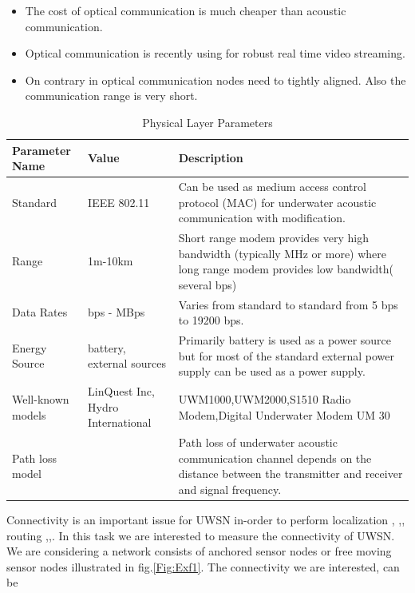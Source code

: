 \documentclass[12pt]{article}
\begin{document}
\begin{itemize}
\begin{itemize}
\cite{doniec2009aquaoptical}.
\item The cost of optical communication is much cheaper than acoustic communication.
\item Optical communication is recently using for robust real time video streaming\cite{doniec2013robust}.
\item On contrary in optical communication nodes need to tightly aligned. Also the communication range is very short.
\end{itemize}
\end{itemize} 

\begin{table}[ht]

\begin{tabular}{|p{2 cm}|p{3cm}|p{10.2cm}|}
\hline
Parameter Name & Value & Description \\\hline 
Standard & IEEE 802.11 & Can be used as medium access control protocol (MAC) for underwater acoustic communication with modification\cite{Farrell201262}.\\ \hline
Range & 1m-10km \cite{heidemann2012underwater} & Short range modem provides very high bandwidth (typically MHz or more) where long range modem provides low bandwidth( several bps) \\ \hline
Data Rates & bps - MBps & Varies from standard to standard from 5 bps to 19200 bps.
\\\hline
Energy Source & battery, external sources& Primarily battery is used as a power source but for most of the standard external power supply can be used as a power supply.
\\\hline
Well-known models & LinQuest Inc, Hydro International &UWM1000,UWM2000,S1510 Radio Modem,Digital Underwater Modem UM 30 
 
\\\hline
Path loss model & & Path loss of underwater acoustic communication channel depends on the distance between the transmitter and receiver and signal frequency\cite{stship}. \\\hline
\end{tabular}

\caption{Physical Layer Parameters}
\label{Tab:PHYP}
\end{table}
Connectivity is an important issue for UWSN in-order to perform localization \cite{zhou2010efficient}, \cite{zhou2011scalable},\cite{erol2011performance}, routing \cite{noh2013vapr},\cite{ying2011combining},\cite{lee2010pressure}. In this task we are interested to measure the connectivity of UWSN. We are considering a network consists of anchored sensor nodes or free moving sensor nodes illustrated in fig.\ref{Fig:Exf1}. The connectivity we are interested, can be 
\end{document}
